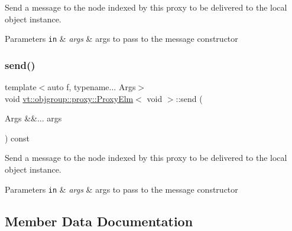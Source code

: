 Send a message to the node indexed by this proxy to be delivered to the local object instance. 


\begin{DoxyParams}[1]{Parameters}
\mbox{\tt in}  & {\em args} & args to pass to the message constructor \\
\hline
\end{DoxyParams}
\mbox{\label{structvt_1_1objgroup_1_1proxy_1_1_proxy_elm_3_01void_01_4_ad2ef80eda4f8671590ae692a0995e6ce}} 
\subsubsection{\texorpdfstring{send()}{send()}\hspace{0.1cm}{\footnotesize\ttfamily [2/2]}}
{\footnotesize\ttfamily template$<$auto f, typename... Args$>$ \\
void \hyperlink{structvt_1_1objgroup_1_1proxy_1_1_proxy_elm}{vt\+::objgroup\+::proxy\+::\+Proxy\+Elm}$<$ void $>$\+::send (\begin{DoxyParamCaption}\item[{Args \&\&...}]{args }\end{DoxyParamCaption}) const\hspace{0.3cm}{\ttfamily [inline]}}



Send a message to the node indexed by this proxy to be delivered to the local object instance. 


\begin{DoxyParams}[1]{Parameters}
\mbox{\tt in}  & {\em args} & args to pass to the message constructor \\
\hline
\end{DoxyParams}


\subsection{Member Data Documentation}
\mbox{\label{structvt_1_1objgroup_1_1proxy_1_1_proxy_elm_3_01void_01_4_aa09e3bed73c03d683858969775d5d043}} 
